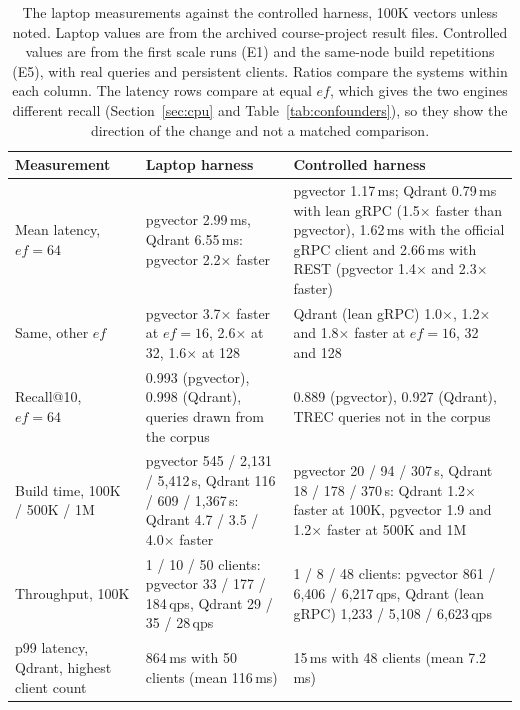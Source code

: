 \documentclass[sigconf, nonacm]{acmart}
\begin{document}
\begin{table}[t]
  \caption{The laptop measurements against the controlled harness, 100K vectors unless noted.
  Laptop values are from the archived course-project result files. Controlled values are from
  the first scale runs (E1) and the same-node build repetitions (E5), with real queries and
  persistent clients. Ratios compare the systems within each column. The latency rows compare
  at equal $ef$, which gives the two engines different recall (Section~\ref{sec:cpu} and
  Table~\ref{tab:confounders}), so they show the direction of the change and not a matched
  comparison.}
  \label{tab:laptop}
  \small
  \begin{tabular}{p{}p{}p{}}
    \toprule
    Measurement & Laptop harness & Controlled harness \\
    \midrule
    Mean latency, $ef=64$ &
      pgvector 2.99\,ms, Qdrant 6.55\,ms: pgvector 2.2$\times$ faster &
      pgvector 1.17\,ms; Qdrant 0.79\,ms with lean gRPC (1.5$\times$ faster than pgvector),
      1.62\,ms with the official gRPC client and 2.66\,ms with REST (pgvector 1.4$\times$ and
      2.3$\times$ faster) \\
    Same, other $ef$ &
      pgvector 3.7$\times$ faster at $ef=16$, 2.6$\times$ at 32, 1.6$\times$ at 128 &
      Qdrant (lean gRPC) 1.0$\times$, 1.2$\times$ and 1.8$\times$ faster at $ef=16$, 32 and 128 \\
    Recall@10, $ef=64$ &
      0.993 (pgvector), 0.998 (Qdrant), queries drawn from the corpus &
      0.889 (pgvector), 0.927 (Qdrant), TREC queries not in the corpus \\
    Build time, 100K / 500K / 1M &
      pgvector 545 / 2{,}131 / 5{,}412\,s, Qdrant 116 / 609 / 1{,}367\,s: Qdrant 4.7 / 3.5 /
      4.0$\times$ faster &
      pgvector 20 / 94 / 307\,s, Qdrant 18 / 178 / 370\,s: Qdrant 1.2$\times$ faster at 100K,
      pgvector 1.9 and 1.2$\times$ faster at 500K and 1M \\
    Throughput, 100K &
      1 / 10 / 50 clients: pgvector 33 / 177 / 184\,qps, Qdrant 29 / 35 / 28\,qps &
      1 / 8 / 48 clients: pgvector 861 / 6{,}406 / 6{,}217\,qps, Qdrant (lean gRPC) 1{,}233 /
      5{,}108 / 6{,}623\,qps \\
    p99 latency, Qdrant, highest client count &
      864\,ms with 50 clients (mean 116\,ms) &
      15\,ms with 48 clients (mean 7.2\,ms) \\
    \bottomrule
  \end{tabular}
\end{table}
\end{document}
